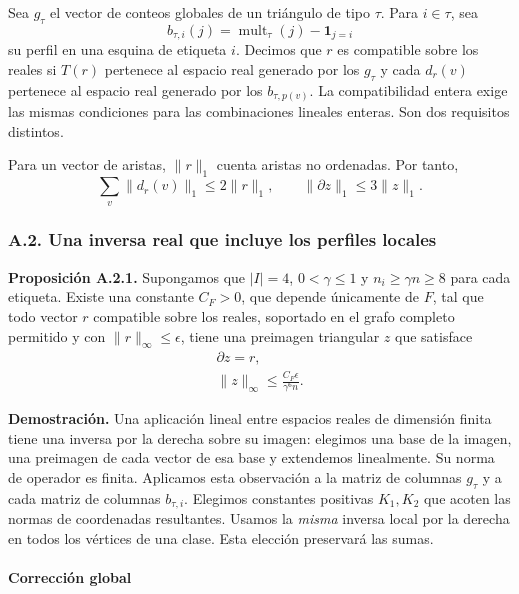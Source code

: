 \documentclass[spanish,11pt,a4paper]{article}
\begin{document}
Sea \(g_\tau\) el vector de conteos globales de un triángulo de tipo \(\tau\). Para \(i\in\tau\), sea \[b_{\tau,i}(j)=\operatorname{mult}_\tau(j)-\mathbf1_{j=i}\] su perfil en una esquina de etiqueta \(i\). Decimos que \(r\) es compatible sobre los reales si \(T(r)\) pertenece al espacio real generado por los \(g_\tau\) y cada \(d_r(v)\) pertenece al espacio real generado por los \(b_{\tau,p(v)}\). La compatibilidad entera exige las mismas condiciones para las combinaciones lineales enteras. Son dos requisitos distintos.

Para un vector de aristas, \(\|r\|_1\) cuenta aristas no ordenadas. Por tanto, \[\sum_v\|d_r(v)\|_1\le 2\|r\|_1,
\qquad \|\partial z\|_1\le3\|z\|_1.
\tag{A.1.1}\]

\subsubsection{A.2. Una inversa real que incluye los perfiles locales}\label{a.2.-una-inversa-real-que-incluye-los-perfiles-locales}

\textbf{Proposición A.2.1.} Supongamos que \(|I|=4\), \(0<\gamma\le1\) y \(n_i\ge\gamma n\ge8\) para cada etiqueta. Existe una constante \(C_F>0\), que depende únicamente de \(F\), tal que todo vector \(r\) compatible sobre los reales, soportado en el grafo completo permitido y con \(\|r\|_\infty\le\epsilon\), tiene una preimagen triangular \(z\) que satisface \[\begin{gathered}
\partial z=r,\\
\|z\|_\infty\le \frac{C_F\epsilon}{\gamma^6n}.
\end{gathered}
\tag{A.2.1}\]

\textbf{Demostración.} Una aplicación lineal entre espacios reales de dimensión finita tiene una inversa por la derecha sobre su imagen: elegimos una base de la imagen, una preimagen de cada vector de esa base y extendemos linealmente. Su norma de operador es finita. Aplicamos esta observación a la matriz de columnas \(g_\tau\) y a cada matriz de columnas \(b_{\tau,i}\). Elegimos constantes positivas \(K_1,K_2\) que acoten las normas de coordenadas resultantes. Usamos la \emph{misma} inversa local por la derecha en todos los vértices de una clase. Esta elección preservará las sumas.

\paragraph{Corrección global}\label{correcciuxf3n-global}
\end{document}
